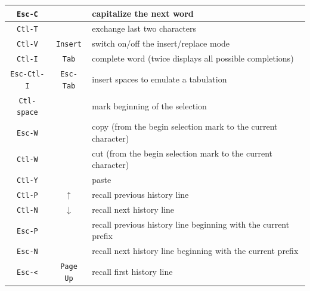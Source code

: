 \begin{tabular}{|c|c|l|}
\hline

\texttt{Esc-C} & & capitalize the next word \\

\hline

\texttt{Ctl-T} & & exchange last two characters \\

\hline

\texttt{Ctl-V} & \texttt{Insert} & switch on/off the insert/replace mode \\

\hline

\texttt{Ctl-I} & \texttt{Tab} & complete word (twice displays all possible
completions) \\

\hline
\texttt{Esc-Ctl-I} & \texttt{Esc-Tab} & insert spaces to emulate a tabulation \\

\hline

\texttt{Ctl-space} & & mark beginning of the selection \\

\hline

\texttt{Esc-W} & & copy (from the begin selection mark to the current
character) \\

\hline

\texttt{Ctl-W} & & cut (from the begin selection mark to the current
character) \\

\hline

\texttt{Ctl-Y} & & paste \\

\hline

\texttt{Ctl-P} & \texttt{$\uparrow$} & recall previous history line \\

\hline

\texttt{Ctl-N} & \texttt{$\downarrow$} & recall next history line \\

\hline

\texttt{Esc-P} & & recall previous history line beginning with the current
prefix \\

\hline

\texttt{Esc-N} & & recall next history line beginning with the current
prefix \\

\hline

\texttt{Esc-<} & \texttt{Page Up} & recall first history line \\


\end{tabular}
